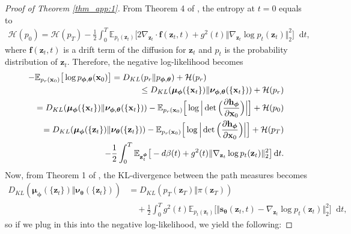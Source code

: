\documentclass{article}
\theoremstyle{definition}
\theoremstyle{remark}
\newcommand*\diff{\mathop{}\!\mathrm{d}}
\begin{document}
\begin{proof}[Proof of Theorem \ref{thm_app:1}]
		From Theorem 4 of \citet{song2021maximum}, the entropy at $t=0$ equals to
		\begin{align*}
		\mathcal{H}(p_{0})=\mathcal{H}(p_{T})-\frac{1}{2}\int_{0}^{T}\mathbb{E}_{p_{t}(\mathbf{z}_{t})}\big[2\nabla_{\mathbf{z}_{t}}\cdot\mathbf{f}(\mathbf{z}_{t},t)+g^{2}(t)\Vert\nabla_{\mathbf{z}_{t}}\log{p_{t}(\mathbf{z}_{t})}\Vert_{2}^{2}\big]\diff t,
		\end{align*}
		where $\mathbf{f}(\mathbf{z}_{t},t)$ is a drift term of the diffusion for $\mathbf{z}_{t}$ and $p_{t}$ is the probability distribution of $\mathbf{z}_{t}$. Therefore, the negative log-likelihood becomes
		\begin{eqnarray*}
			\lefteqn{-\mathbb{E}_{p_{r}(\mathbf{x}_{0})}\big[\log{p_{\bm{\phi},\bm{\theta}}(\mathbf{x}_{0})}\big]=D_{KL}(p_{r}\Vert p_{\bm{\phi},\bm{\theta}})+\mathcal{H}(p_{r})}\\
			&&\le D_{KL}(\bm{\mu}_{\bm{\phi}}(\{\mathbf{x}_{t}\})\Vert\bm{\nu}_{\bm{\phi},\bm{\theta}}(\{\mathbf{x}_{t}\}))+\mathcal{H}(p_{r})\\
			&&= D_{KL}(\bm{\mu}_{\bm{\phi}}(\{\mathbf{x}_{t}\})\Vert\bm{\nu}_{\bm{\phi},\bm{\theta}}(\{\mathbf{x}_{t}\}))-\mathbb{E}_{p_{r}(\mathbf{x}_{0})}\Big[\log{\Big\vert\det\Big(\frac{\partial\mathbf{h}_{\bm{\phi}}}{\partial\mathbf{x}_{0}}\Big)\Big\vert}\Big]+\mathcal{H}(p_{0})\\
			&&= D_{KL}(\bm{\mu}_{\bm{\phi}}(\{\mathbf{z}_{t}\})\Vert\bm{\nu}_{\bm{\theta}}(\{\mathbf{z}_{t}\}))-\mathbb{E}_{p_{r}(\mathbf{x}_{0})}\Big[\log{\Big\vert\det\Big(\frac{\partial\mathbf{h}_{\bm{\phi}}}{\partial\mathbf{x}_{0}}\Big)\Big\vert}\Big]+\mathcal{H}(p_{T})\\
			&&\quad-\frac{1}{2}\int_{0}^{T}\mathbb{E}_{\mathbf{z}_{t}^{\bm{\phi}}}\big[-d\beta(t)+g^{2}(t)\Vert\nabla_{\mathbf{z}_{t}}\log{p_{t}(\mathbf{z}_{t})}\Vert_{2}^{2}\big]\diff t.
		\end{eqnarray*}
		Now, from Theorem 1 of \cite{song2021maximum}, the KL-divergence between the path measures becomes
		\begin{align}\label{eq:nelbo}
		D_{KL}(\bm{\mu}_{\bm{\phi}}(\{\mathbf{z}_{t}\})\Vert\bm{\nu}_{\bm{\theta}}(\{\mathbf{z}_{t}\}))&=D_{KL}(p_{T}(\mathbf{z}_{T})\Vert\pi(\mathbf{z}_{T}))\\
		&\quad+\frac{1}{2}\int_{0}^{T}g^{2}(t)\mathbb{E}_{p_{t}(\mathbf{z}_{t})}\big[\Vert\mathbf{s}_{\bm{\theta}}(\mathbf{z}_{t},t)-\nabla_{\mathbf{z}_{t}}\log{p_{t}(\mathbf{z}_{t})}\Vert_{2}^{2}\big]\diff t,
		\end{align}
		so if we plug in this into the negative log-likelihood, we yield the following:

\end{proof}
\end{document}
